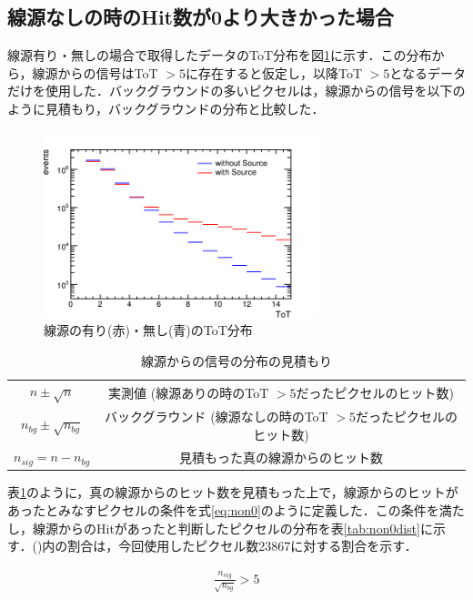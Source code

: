 \subsection*{線源なしの時のHit数が0より大きかった場合}
線源有り・無しの場合で取得したデータのToT分布を図\ref{fig:selftot}に示す．この分布から，線源からの信号はToT $> 5$に存在すると仮定し，以降ToT $>5$となるデータだけを使用した．バックグラウンドの多いピクセルは，線源からの信号を以下のように見積もり，バックグラウンドの分布と比較した．

\begin{figure}[h]
  \centering
  \includegraphics[width=8cm]{./figure/selftot.png}
  \caption{線源の有り(赤)・無し(青)のToT分布}
  \label{fig:selftot}
\end{figure}


\begin{table}[h]
  \centering
  \caption{線源からの信号の分布の見積もり}
  \label{tb:selfnon0}
  \begin{tabular}{cc} \hline
    $n \pm \sqrt{n}$ & 実測値  (線源ありの時のToT $>5$だったピクセルのヒット数) \\
    $n_{bg} \pm \sqrt{n_{bg}}$ & バックグラウンド  (線源なしの時のToT $>5$だったピクセルのヒット数)\\
    $n_{sig} = n - n_{bg}$ & 見積もった真の線源からのヒット数 \\ \hline
  \end{tabular}
\end{table}

表\ref{tb:selfnon0}のように，真の線源からのヒット数を見積もった上で，線源からのヒットがあったとみなすピクセルの条件を式\ref{eq:non0}のように定義した．この条件を満たし，線源からのHitがあったと判断したピクセルの分布を表\ref{tab:non0dist}に示す．()内の割合は，今回使用したピクセル数23867に対する割合を示す．

\begin{eqnarray}
  \label{eq:non0}
  \frac{n_{sig}}{\sqrt{n_{bg}}} > 5
\end{eqnarray}

